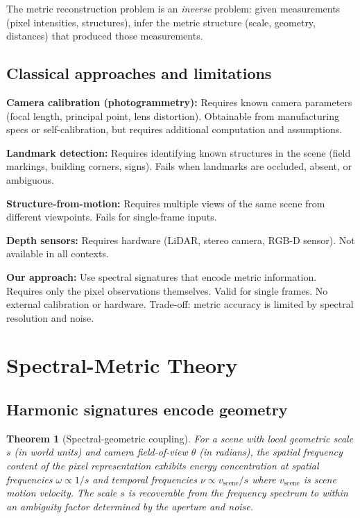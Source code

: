 \documentclass[11pt,twocolumn,a4paper]{article}
\newtheorem{theorem}{Theorem}[section]
\theoremstyle{definition}
\begin{document}
The metric reconstruction problem is an \emph{inverse} problem: given measurements (pixel intensities, structures), infer the metric structure (scale, geometry, distances) that produced those measurements.

\subsection{Classical approaches and limitations}

\textbf{Camera calibration (photogrammetry):} Requires known camera parameters (focal length, principal point, lens distortion). Obtainable from manufacturing specs or self-calibration, but requires additional computation and assumptions.

\textbf{Landmark detection:} Requires identifying known structures in the scene (field markings, building corners, signs). Fails when landmarks are occluded, absent, or ambiguous.

\textbf{Structure-from-motion:} Requires multiple views of the same scene from different viewpoints. Fails for single-frame inputs.

\textbf{Depth sensors:} Requires hardware (LiDAR, stereo camera, RGB-D sensor). Not available in all contexts.

\textbf{Our approach:} Use spectral signatures that encode metric information. Requires only the pixel observations themselves. Valid for single frames. No external calibration or hardware. Trade-off: metric accuracy is limited by spectral resolution and noise.

\section{Spectral-Metric Theory}
\label{sec:theory}

\subsection{Harmonic signatures encode geometry}

\begin{theorem}[Spectral-geometric coupling]
\label{thm:spectral_geom}
For a scene with local geometric scale $s$ (in world units) and camera field-of-view $\theta$ (in radians), the spatial frequency content of the pixel representation exhibits energy concentration at spatial frequencies $\omega \propto 1/s$ and temporal frequencies $\nu \propto v_{\text{scene}}/s$ where $v_{\text{scene}}$ is scene motion velocity. The scale $s$ is recoverable from the frequency spectrum to within an ambiguity factor determined by the aperture and noise.
\end{theorem}
\end{document}
